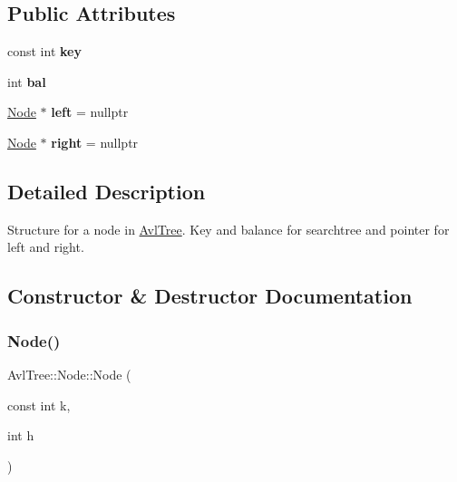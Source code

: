 \subsection*{Public Attributes}
\begin{DoxyCompactItemize}
\item 
\mbox{\label{struct_avl_tree_1_1_node_a5e019874462dc220f3ea60a67f155b37}} 
const int {\bfseries key}
\item 
\mbox{\label{struct_avl_tree_1_1_node_ad0f95ad3dc68259f55a05c7ecd9185ae}} 
int {\bfseries bal}
\item 
\mbox{\label{struct_avl_tree_1_1_node_a5fe701754b58ee26f3a3dd6230521fe7}} 
\mbox{\hyperlink{struct_avl_tree_1_1_node}{Node}} $\ast$ {\bfseries left} = nullptr
\item 
\mbox{\label{struct_avl_tree_1_1_node_a9fd500f3f0a514bb69939431b85e2913}} 
\mbox{\hyperlink{struct_avl_tree_1_1_node}{Node}} $\ast$ {\bfseries right} = nullptr
\end{DoxyCompactItemize}


\subsection{Detailed Description}
Structure for a node in \mbox{\hyperlink{class_avl_tree}{Avl\+Tree}}. Key and balance for searchtree and pointer for left and right. 

\subsection{Constructor \& Destructor Documentation}
\mbox{\label{struct_avl_tree_1_1_node_a839da38cdb6f85ea5a62aae90b0715bc}} 
\subsubsection{\texorpdfstring{Node()}{Node()}\hspace{0.1cm}{\footnotesize\ttfamily [1/2]}}
{\footnotesize\ttfamily Avl\+Tree\+::\+Node\+::\+Node (\begin{DoxyParamCaption}\item[{const int}]{k,  }\item[{int}]{h }\end{DoxyParamCaption})}

